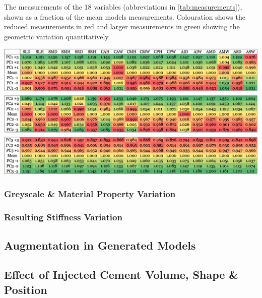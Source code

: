 \begin{landscape}

\begin{table}[p]
  \centering
  \caption{The measurements of the 18 variables (abbreviations in \cref{tab:measurements}), shown as a fraction of the mean models measurements. Colouration shows the reduced measurements in red and larger measurements in green showing the geometric variation quantitatively.}
  \includegraphics[width=1.7\textwidth]{Chapters/Chapter_PCA_images/pca_geo_table.png}
  \label{tab:pca_geo_tab}
\end{table}

\end{landscape}

\pagebreak



\subsubsection{Greyscale \& Material Property Variation}




\subsubsection{Resulting Stiffness Variation}





\subsection{Augmentation in Generated Models}
\subsection{Effect of Injected Cement Volume, Shape \& Position}



